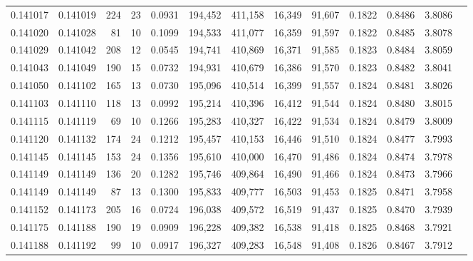 \begin{tabular}{rrrrrrrrrrrrr}
0.141017 & 0.141019 &   224 &  23 &                                     0.0931 & 194,452 & 411,158 &  16,349 &  91,607 & 0.1822 & 0.8486 & 3.8086 \\
0.141020 & 0.141028 &    81 &  10 &                                     0.1099 & 194,533 & 411,077 &  16,359 &  91,597 & 0.1822 & 0.8485 & 3.8078 \\
0.141029 & 0.141042 &   208 &  12 &                                     0.0545 & 194,741 & 410,869 &  16,371 &  91,585 & 0.1823 & 0.8484 & 3.8059 \\
0.141043 & 0.141049 &   190 &  15 &                                     0.0732 & 194,931 & 410,679 &  16,386 &  91,570 & 0.1823 & 0.8482 & 3.8041 \\
0.141050 & 0.141102 &   165 &  13 &                                     0.0730 & 195,096 & 410,514 &  16,399 &  91,557 & 0.1824 & 0.8481 & 3.8026 \\
0.141103 & 0.141110 &   118 &  13 &                                     0.0992 & 195,214 & 410,396 &  16,412 &  91,544 & 0.1824 & 0.8480 & 3.8015 \\
0.141115 & 0.141119 &    69 &  10 &                                     0.1266 & 195,283 & 410,327 &  16,422 &  91,534 & 0.1824 & 0.8479 & 3.8009 \\
0.141120 & 0.141132 &   174 &  24 &                                     0.1212 & 195,457 & 410,153 &  16,446 &  91,510 & 0.1824 & 0.8477 & 3.7993 \\
0.141145 & 0.141145 &   153 &  24 &                                     0.1356 & 195,610 & 410,000 &  16,470 &  91,486 & 0.1824 & 0.8474 & 3.7978 \\
0.141149 & 0.141149 &   136 &  20 &                                     0.1282 & 195,746 & 409,864 &  16,490 &  91,466 & 0.1824 & 0.8473 & 3.7966 \\
0.141149 & 0.141149 &    87 &  13 &                                     0.1300 & 195,833 & 409,777 &  16,503 &  91,453 & 0.1825 & 0.8471 & 3.7958 \\
0.141152 & 0.141173 &   205 &  16 &                                     0.0724 & 196,038 & 409,572 &  16,519 &  91,437 & 0.1825 & 0.8470 & 3.7939 \\
0.141175 & 0.141188 &   190 &  19 &                                     0.0909 & 196,228 & 409,382 &  16,538 &  91,418 & 0.1825 & 0.8468 & 3.7921 \\
0.141188 & 0.141192 &    99 &  10 &                                     0.0917 & 196,327 & 409,283 &  16,548 &  91,408 & 0.1826 & 0.8467 & 3.7912 \\

\end{tabular}
